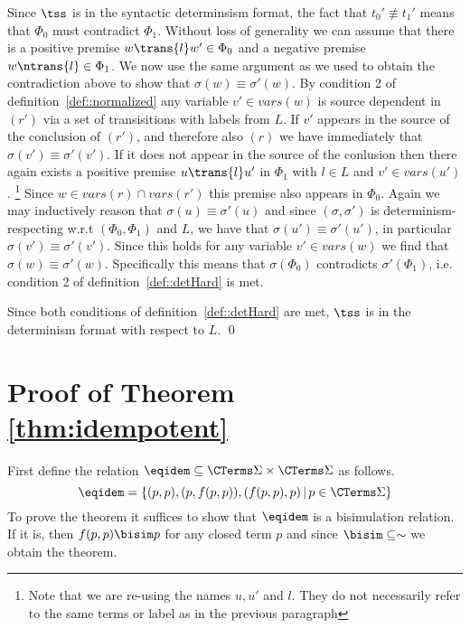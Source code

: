 Since $\tss$ is in the syntactic determinsism format, the fact that $t_0' \not\equiv t_1'$
means that $\Phi_0$ must contradict $\Phi_1$. Without loss of generality we can assume that
there is a positive premise $w \trans{l} w' \in \Phi_0$ and a negative premise
$w \ntrans{l} \in \Phi_1$. We now use the same argument as we
used to obtain the contradiction above to show that
$\sigma(w) \equiv \sigma'(w)$.
By condition 2 of definition~\ref{def::normalized} any variable
$v' \in vars(w)$ is source dependent in $(r')$ via a set of transisitions with labels from
$L$. If $v'$ appears in the source of the conclusion of $(r')$, and therefore also $(r)$
we have immediately that $\sigma(v') \equiv \sigma'(v')$. If it does not appear in the
source of the conlusion then there again exists a positive premise
$u \trans{l} u'$ in $\Phi_1$
with $l\in L$ and $v' \in vars(u')$.%
\footnote{Note that we are re-using the names $u, u'$ and $l$. They do not necessarily refer
to the same terms or label as in the previous paragraph}
Since $w \in vars(r) \cap vars(r')$ this premise also appears in $\Phi_0$.
Again we may inductively reason that $\sigma(u)
\equiv \sigma'(u)$ and since $(\sigma,\sigma')$ is determinism-respecting w.r.t $(\Phi_0,
\Phi_1)$ and $L$, we have that $\sigma(u')\equiv\sigma'(u')$, in particular $\sigma(v')
\equiv \sigma'(v')$. Since this holds for any variable $v' \in vars(w)$ we find that
$\sigma(w)\equiv \sigma'(w)$. Specifically this means that $\sigma(\Phi_0)$ contradicts
$\sigma'(\Phi_1)$, i.e. condition 2 of definition~\ref{def::detHard} is met.

Since both conditions of definition~\ref{def::detHard} are met, $\tss$ is in the
determinism format with respect to $L$. \hfill\qed
\fi

\section{Proof of Theorem \ref{thm:idempotent}}
\label{proof:idempotent}
First define the relation $\eqidem \subseteq \CTerms\Sigma \times \CTerms\Sigma$ as follows.
\[
    \eqidem = \{ (p,p), (p,f(p,p)), (f(p,p),p) \,|\, p \in \CTerms\Sigma \}
\]
To prove the theorem it suffices to show that $\eqidem$ is a bisimulation relation. If it is, then $f(p,p)\bisim p$ for any closed term $p$ and since $\bisim \subseteq \sim$ we obtain the theorem.

